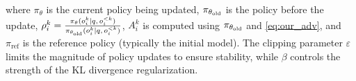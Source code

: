 where $\pi_{\theta}$ is the current policy being updated, $\pi_{\theta_{\text{old}}}$ is the policy before the update,  $\rho_i^k = \tfrac{\pi_{\theta}(o_i^k|q,\, o_i^{<k})}{\pi_{\theta_{\text{old}}}(o_i^k|q,\, o_i^{<k})}$, $A^k_i$ is computed using $\pi_{\theta_{\text{old}}}$ and \cref{eq:our_adv},
and $\pi_{\text{ref}}$ is the reference policy (typically the initial model). 
The clipping parameter $\varepsilon$ limits the magnitude of policy updates to ensure stability, while $\beta$ controls the strength of the KL divergence regularization.


